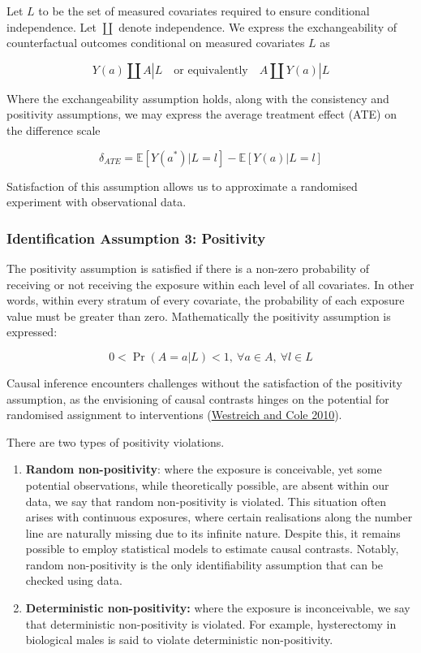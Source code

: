 \documentclass[
  singlecolumn]{article}
\begin{document}
Let \(L\) to be the set of measured covariates required to ensure
conditional independence. Let \(\coprod\) denote independence. We
express the exchangeability of counterfactual outcomes conditional on
measured covariates \(L\) as

\[
Y(a) \coprod  A|L \quad \text{or equivalently} \quad A \coprod  Y(a)|L
\]

Where the exchangeability assumption holds, along with the consistency
and positivity assumptions, we may express the average treatment effect
(ATE) on the difference scale

\[
\delta_{ATE}  = \mathbb{E}[Y(a^*)|L = l] - \mathbb{E}[Y(a)|L = l]
\]

Satisfaction of this assumption allows us to approximate a randomised
experiment with observational data.

\hypertarget{identification-assumption-3-positivity}{%
\subsubsection{Identification Assumption 3:
Positivity}\label{identification-assumption-3-positivity}}

The positivity assumption is satisfied if there is a non-zero
probability of receiving or not receiving the exposure within each level
of all covariates. In other words, within every stratum of every
covariate, the probability of each exposure value must be greater than
zero. Mathematically the positivity assumption is expressed:

\[
0 < \Pr(A=a|L)<1, ~ \forall a \in A, ~ \forall l \in L
\]

Causal inference encounters challenges without the satisfaction of the
positivity assumption, as the envisioning of causal contrasts hinges on
the potential for randomised assignment to interventions
(\protect\hyperlink{ref-westreich2010}{Westreich and Cole 2010}).

There are two types of positivity violations.

\begin{enumerate}
\def\labelenumi{\arabic{enumi}.}
\item
  \textbf{Random non-positivity}: where the exposure is conceivable, yet
  some potential observations, while theoretically possible, are absent
  within our data, we say that random non-positivity is violated. This
  situation often arises with continuous exposures, where certain
  realisations along the number line are naturally missing due to its
  infinite nature. Despite this, it remains possible to employ
  statistical models to estimate causal contrasts. Notably, random
  non-positivity is the only identifiability assumption that can be
  checked using data.
\item
  \textbf{Deterministic non-positivity:} where the exposure is
  inconceivable, we say that deterministic non-positivity is violated.
  For example, hysterectomy in biological males is said to violate
  deterministic non-positivity.
\end{enumerate}
\end{document}
